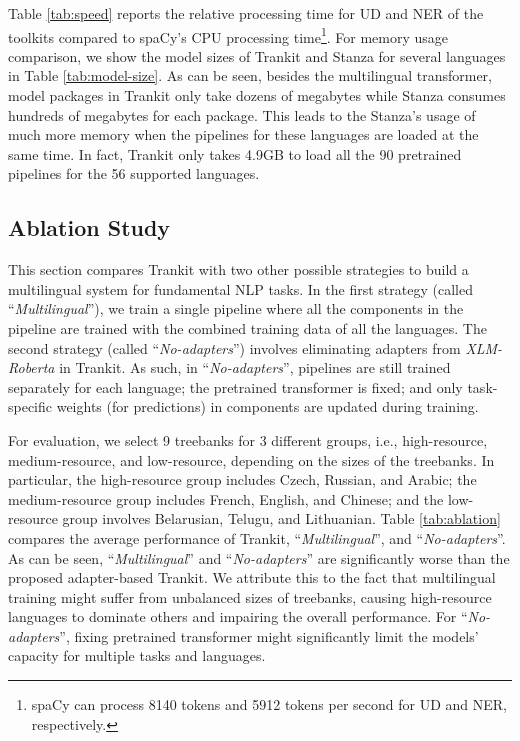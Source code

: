 \documentclass[11pt,a4paper]{article}
\begin{document}
Table \ref{tab:speed} reports the relative processing time for UD and NER of the toolkits compared to spaCy's CPU processing time\footnote{spaCy can process 8140 tokens and 5912 tokens per second for UD and NER, respectively.}. For memory usage comparison, we show the model sizes of Trankit and Stanza for several languages in Table \ref{tab:model-size}. As can be seen, besides the multilingual transformer, model packages in Trankit only take dozens of megabytes while Stanza consumes hundreds of megabytes for each package. This leads to the Stanza's usage of much more memory when the pipelines for these languages are loaded at the same time. In fact, Trankit only takes 4.9GB to load all the 90 pretrained pipelines for the 56 supported languages.





\subsection{Ablation Study}

This section compares Trankit with two other possible strategies to build a multilingual system for fundamental NLP tasks. In the first strategy (called ``\textit{Multilingual}''), we train a single pipeline where all the components in the pipeline are trained with the combined training data of all the languages. The second strategy (called ``\textit{No-adapters}'') involves eliminating adapters from \textit{XLM-Roberta} in Trankit. As such, in ``\textit{No-adapters}'', pipelines are still trained separately for each language; the pretrained transformer is fixed; and only task-specific weights (for predictions) in components are updated during training.





For evaluation, we select 9 treebanks for 3 different groups, i.e., high-resource, medium-resource, and low-resource, depending on the sizes of the treebanks. In particular, the high-resource group includes Czech, Russian, and Arabic; the medium-resource group includes French, English, and Chinese; and the low-resource group involves Belarusian, Telugu, and Lithuanian. Table \ref{tab:ablation} compares the average performance of Trankit, ``\textit{Multilingual}'', and  ``\textit{No-adapters}''. As can be seen, ``\textit{Multilingual}'' and  ``\textit{No-adapters}'' are significantly worse than the proposed adapter-based Trankit. We attribute this to the fact that multilingual training might suffer from unbalanced sizes of treebanks, causing high-resource languages to dominate others and impairing the overall performance. For ``\textit{No-adapters}'', fixing pretrained transformer might significantly limit the models' capacity for multiple tasks and languages.
\end{document}
